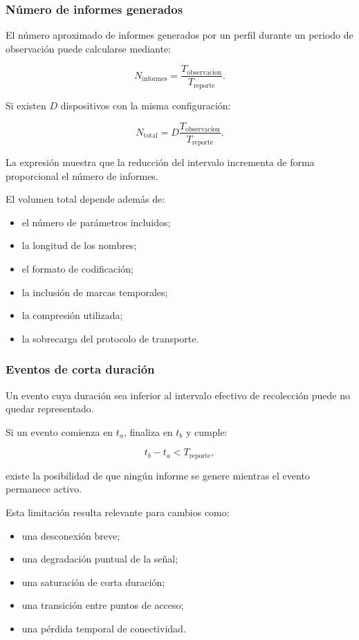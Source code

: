 \subsubsection*{Número de informes generados}

El número aproximado de informes generados por un perfil durante un
periodo de observación puede calcularse mediante:

\[
    N_{\mathrm{informes}}
    =
    \frac{
        T_{\mathrm{observacion}}
    }{
        T_{\mathrm{reporte}}
    }.
\]

Si existen \(D\) dispositivos con la misma configuración:

\[
    N_{\mathrm{total}}
    =
    D
    \frac{
        T_{\mathrm{observacion}}
    }{
        T_{\mathrm{reporte}}
    }.
\]

La expresión muestra que la reducción del intervalo incrementa de forma
proporcional el número de informes.

El volumen total depende además de:

\begin{itemize}
    \item el número de parámetros incluidos;
    \item la longitud de los nombres;
    \item el formato de codificación;
    \item la inclusión de marcas temporales;
    \item la compresión utilizada;
    \item la sobrecarga del protocolo de transporte.
\end{itemize}


\subsubsection*{Eventos de corta duración}

Un evento cuya duración sea inferior al intervalo efectivo de
recolección puede no quedar representado.

Si un evento comienza en \(t_a\), finaliza en \(t_b\) y cumple:

\[
    t_b - t_a
    <
    T_{\mathrm{reporte}},
\]

existe la posibilidad de que ningún informe se genere mientras el evento
permanece activo.

Esta limitación resulta relevante para cambios como:

\begin{itemize}
    \item una desconexión breve;
    \item una degradación puntual de la señal;
    \item una saturación de corta duración;
    \item una transición entre puntos de acceso;
    \item una pérdida temporal de conectividad.
\end{itemize}

